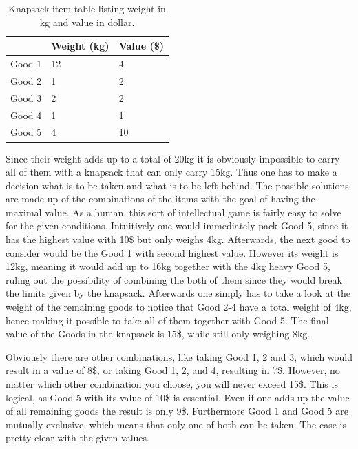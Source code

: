 \documentclass[11pt,a4paper]{article}
\begin{document}
\begin{table}[h!]
\centering
\begin{tabular}{p{}p{}p{}}
\toprule
    & Weight (kg) & Value (\$) \\
\midrule
Good 1  &  12 &   4\\
Good 2  &  1  &  2\\
Good 3  &  2  &  2\\
Good 4  &  1  &  1\\
Good 5  &  4  &  10\\
\bottomrule
\end{tabular}
\caption{Knapsack item table listing weight in kg and value in dollar.}
\label{tbl:ks_prob}
\end{table}

Since their weight adds up to a total of 20kg it is obviously impossible to carry all of them with a knapsack that can only carry 15kg. Thus one has to make a decision what is to be taken and what is to be left behind.
The possible solutions are made up of the combinations of the items with the goal of having the maximal value.
As a human, this sort of intellectual game is fairly easy to solve for the given conditions. Intuitively one would immediately pack Good 5, since it has the highest value with 10\$ but only weighs 4kg. Afterwards, the next good to consider would be the Good 1 with second highest value. However its weight is 12kg, meaning it would add up to 16kg together with the 4kg heavy Good 5, ruling out the possibility of combining the both of them since they would break the limits given by the knapsack.
Afterwards one simply has to take a look at the weight of the remaining goods to notice that Good 2-4 have a total weight of 4kg, hence making it possible to take all of them together with Good 5. The final value of the Goods in the knapsack is 15\$, while still only weighing 8kg.

Obviously there are other combinations, like taking Good 1, 2 and 3, which would result in a value of 8\$, or taking Good 1, 2, and 4, resulting in 7\$. However, no matter which other combination you choose, you will never exceed 15\$.
This is logical, as Good 5 with its value of 10\$ is essential. Even if one adds up the value of all remaining goods the result is only 9\$. Furthermore Good 1 and Good 5 are mutually exclusive, which means that only one of both can be taken. The case is pretty clear with the given values.
\end{document}
